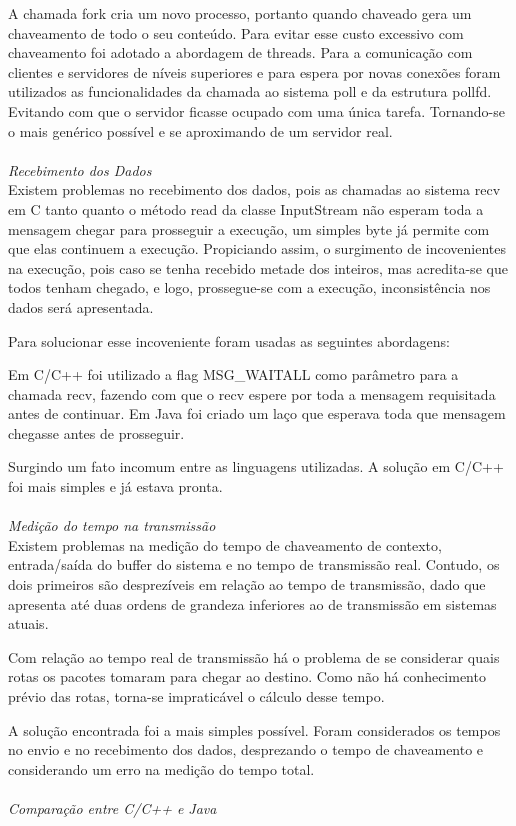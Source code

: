 \documentclass[12pt,a4paper]{article}
\begin{document}
A chamada fork cria um novo processo, portanto quando chaveado gera um chaveamento de todo o seu conteúdo. Para evitar esse custo excessivo com chaveamento foi adotado a abordagem de threads.
Para a comunicação com clientes e servidores de níveis superiores e para espera por novas conexões foram utilizados as funcionalidades da chamada ao sistema poll e da estrutura pollfd. Evitando com que o servidor ficasse ocupado com uma única tarefa. Tornando-se o mais genérico possível e se aproximando de um servidor real.
\\\\
\textit{\Large{Recebimento dos Dados}}
\\

Existem problemas no recebimento dos dados, pois as chamadas ao sistema recv em C tanto quanto o método read da classe InputStream não esperam toda a mensagem chegar para prosseguir a execução, um simples byte já permite com que elas continuem a execução. Propiciando assim, o surgimento de incovenientes na execução, pois caso se tenha recebido metade dos inteiros, mas acredita-se que todos tenham chegado, e logo, prossegue-se com a execução, inconsistência nos dados será apresentada.

Para solucionar esse incoveniente foram usadas as seguintes abordagens:

Em C/C++  foi utilizado a flag MSG_WAITALL como parâmetro para a chamada recv, fazendo com que o recv espere por toda a mensagem requisitada antes de continuar. Em Java foi criado um laço que esperava toda que mensagem chegasse antes de prosseguir.

Surgindo um fato incomum entre as linguagens utilizadas. A solução em C/C++ foi mais simples e já estava pronta. 
\\\\
\textit{\Large{Medição do tempo na transmissão}}
\\

Existem problemas na medição do tempo de chaveamento de contexto, entrada/saída do buffer do sistema e no tempo de transmissão real. Contudo, os dois primeiros são desprezíveis em relação ao tempo de transmissão, dado que apresenta até duas ordens de grandeza inferiores ao de transmissão em sistemas atuais.

Com relação ao tempo real de transmissão há o problema de se considerar quais rotas os pacotes tomaram para chegar ao destino. Como não há conhecimento prévio das rotas, torna-se impraticável o cálculo desse tempo.

A solução encontrada foi a mais simples possível. Foram considerados os tempos no envio e no recebimento dos dados,  desprezando o tempo de chaveamento e considerando um erro na medição do tempo total.
\\\\
\textit{\Large{Comparação entre C/C++ e Java}}
\\
\end{document}
